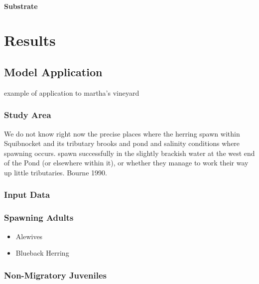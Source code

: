 \documentclass[
]{book}
\providecommand{\tightlist}{%
  \setlength{\itemsep}{0pt}\setlength{\parskip}{0pt}}
\begin{document}
\hypertarget{substrate-8}{%
\subsubsection{Substrate}\label{substrate-8}}

\hypertarget{results}{%
\chapter{Results}\label{results}}

\hypertarget{model-application}{%
\section{Model Application}\label{model-application}}

example of application to martha's vineyard

\hypertarget{study-area}{%
\subsection{Study Area}\label{study-area}}

We do not know right now the precise
places where the herring spawn within Squibnocket
and its tributary brooks and pond and salinity conditions where spawning occurs. spawn successfully in the slightly brackish water
at the west end of the Pond (or elsewhere within
it), or whether they manage to work their way up
little tributaries. Bourne 1990.

\hypertarget{input-data}{%
\subsection{Input Data}\label{input-data}}

\hypertarget{spawning-adults-2}{%
\subsection{Spawning Adults}\label{spawning-adults-2}}

\begin{itemize}
\tightlist
\item
  Alewives
\item
  Blueback Herring
\end{itemize}

\hypertarget{non-migratory-juveniles-4}{%
\subsection{Non-Migratory Juveniles}\label{non-migratory-juveniles-4}}
\end{document}
